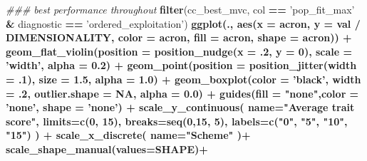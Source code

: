 \documentclass[]{book}
\newenvironment{Shaded}{\begin{snugshade}}{\end{snugshade}}
\newcommand{\CommentTok}[1]{\textcolor[rgb]{0.56,0.35,0.01}{\textit{#1}}}
\newcommand{\DataTypeTok}[1]{\textcolor[rgb]{0.13,0.29,0.53}{#1}}
\newcommand{\DecValTok}[1]{\textcolor[rgb]{0.00,0.00,0.81}{#1}}
\newcommand{\FloatTok}[1]{\textcolor[rgb]{0.00,0.00,0.81}{#1}}
\newcommand{\KeywordTok}[1]{\textcolor[rgb]{0.13,0.29,0.53}{\textbf{#1}}}
\newcommand{\NormalTok}[1]{#1}
\newcommand{\OperatorTok}[1]{\textcolor[rgb]{0.81,0.36,0.00}{\textbf{#1}}}
\newcommand{\OtherTok}[1]{\textcolor[rgb]{0.56,0.35,0.01}{#1}}
\newcommand{\StringTok}[1]{\textcolor[rgb]{0.31,0.60,0.02}{#1}}
\begin{document}
\begin{Shaded}
\begin{Highlighting}[]
\CommentTok{### best performance throughout}
\KeywordTok{filter}\NormalTok{(cc_best_mvc, col }\OperatorTok{==}\StringTok{ 'pop_fit_max'} \OperatorTok{&}\StringTok{ }\NormalTok{diagnostic }\OperatorTok{==}\StringTok{ 'ordered_exploitation'}\NormalTok{) }\OperatorTok{%>%}
\StringTok{  }\KeywordTok{ggplot}\NormalTok{(., }\KeywordTok{aes}\NormalTok{(}\DataTypeTok{x =}\NormalTok{ acron, }\DataTypeTok{y =}\NormalTok{ val }\OperatorTok{/}\StringTok{ }\NormalTok{DIMENSIONALITY, }\DataTypeTok{color =}\NormalTok{ acron, }\DataTypeTok{fill =}\NormalTok{ acron, }\DataTypeTok{shape =}\NormalTok{ acron)) }\OperatorTok{+}
\StringTok{  }\KeywordTok{geom_flat_violin}\NormalTok{(}\DataTypeTok{position =} \KeywordTok{position_nudge}\NormalTok{(}\DataTypeTok{x =} \FloatTok{.2}\NormalTok{, }\DataTypeTok{y =} \DecValTok{0}\NormalTok{), }\DataTypeTok{scale =} \StringTok{'width'}\NormalTok{, }\DataTypeTok{alpha =} \FloatTok{0.2}\NormalTok{) }\OperatorTok{+}
\StringTok{  }\KeywordTok{geom_point}\NormalTok{(}\DataTypeTok{position =} \KeywordTok{position_jitter}\NormalTok{(}\DataTypeTok{width =} \FloatTok{.1}\NormalTok{), }\DataTypeTok{size =} \FloatTok{1.5}\NormalTok{, }\DataTypeTok{alpha =} \FloatTok{1.0}\NormalTok{) }\OperatorTok{+}
\StringTok{  }\KeywordTok{geom_boxplot}\NormalTok{(}\DataTypeTok{color =} \StringTok{'black'}\NormalTok{, }\DataTypeTok{width =} \FloatTok{.2}\NormalTok{, }\DataTypeTok{outlier.shape =} \OtherTok{NA}\NormalTok{, }\DataTypeTok{alpha =} \FloatTok{0.0}\NormalTok{) }\OperatorTok{+}
\StringTok{  }\KeywordTok{guides}\NormalTok{(}\DataTypeTok{fill =} \StringTok{"none"}\NormalTok{,}\DataTypeTok{color =} \StringTok{'none'}\NormalTok{, }\DataTypeTok{shape =} \StringTok{'none'}\NormalTok{) }\OperatorTok{+}
\StringTok{  }\KeywordTok{scale_y_continuous}\NormalTok{(}
    \DataTypeTok{name=}\StringTok{"Average trait score"}\NormalTok{,}
    \DataTypeTok{limits=}\KeywordTok{c}\NormalTok{(}\DecValTok{0}\NormalTok{, }\DecValTok{15}\NormalTok{),}
    \DataTypeTok{breaks=}\KeywordTok{seq}\NormalTok{(}\DecValTok{0}\NormalTok{,}\DecValTok{15}\NormalTok{, }\DecValTok{5}\NormalTok{),}
    \DataTypeTok{labels=}\KeywordTok{c}\NormalTok{(}\StringTok{"0"}\NormalTok{, }\StringTok{"5"}\NormalTok{, }\StringTok{"10"}\NormalTok{, }\StringTok{"15"}\NormalTok{)}
\NormalTok{  ) }\OperatorTok{+}
\StringTok{  }\KeywordTok{scale_x_discrete}\NormalTok{(}
    \DataTypeTok{name=}\StringTok{"Scheme"}
\NormalTok{  )}\OperatorTok{+}
\StringTok{  }\KeywordTok{scale_shape_manual}\NormalTok{(}\DataTypeTok{values=}\NormalTok{SHAPE)}\OperatorTok{+}
}
\end{Highlighting}
\end{Shaded}
\end{document}
